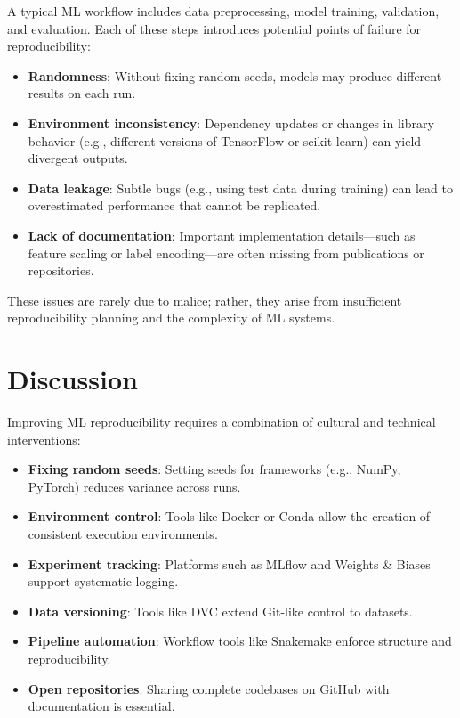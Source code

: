 \documentclass[11pt]{article}
\begin{document}
A typical ML workflow includes data preprocessing, model training, validation, and evaluation. Each of these steps introduces potential points of failure for reproducibility:

\begin{itemize}
    \item \textbf{Randomness}: Without fixing random seeds, models may produce different results on each run.
    \item \textbf{Environment inconsistency}: Dependency updates or changes in library behavior (e.g., different versions of TensorFlow or scikit-learn) can yield divergent outputs.
    \item \textbf{Data leakage}: Subtle bugs (e.g., using test data during training) can lead to overestimated performance that cannot be replicated.
    \item \textbf{Lack of documentation}: Important implementation details---such as feature scaling or label encoding---are often missing from publications or repositories.
\end{itemize}

These issues are rarely due to malice; rather, they arise from insufficient reproducibility planning and the complexity of ML systems.


\section{Discussion}
\label{sec:system}
Improving ML reproducibility requires a combination of cultural and technical interventions:

\begin{itemize}
    \item \textbf{Fixing random seeds}: Setting seeds for frameworks (e.g., NumPy, PyTorch) reduces variance across runs.
    \item \textbf{Environment control}: Tools like Docker or Conda allow the creation of consistent execution environments.
    \item \textbf{Experiment tracking}: Platforms such as MLflow and Weights \& Biases support systematic logging.
    \item \textbf{Data versioning}: Tools like DVC extend Git-like control to datasets.
    \item \textbf{Pipeline automation}: Workflow tools like Snakemake enforce structure and reproducibility.
    \item \textbf{Open repositories}: Sharing complete codebases on GitHub with documentation is essential.
\end{itemize}
\end{document}
